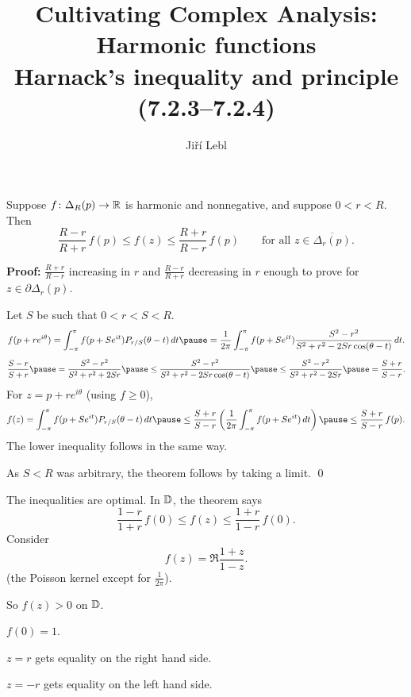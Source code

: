 \documentclass[10pt,aspectratio=169]{beamer}
\author{Ji\v{r}\'i Lebl}
\institute[OSU]{%
Departemento pri Matematiko de Oklahoma {\^S}tata Universitato}
\title{Cultivating Complex Analysis:\\%
Harmonic functions\\%
Harnack's inequality and principle (7.2.3--7.2.4)}
\date{}
\begin{document}
\begin{frame}
\titlepage
\end{frame}

\begin{frame}
\begin{theorem}
Suppose $f \colon \Delta_R(p) \to {\mathbb{R}}$ is harmonic and nonnegative,
and suppose $0 < r < R$.
Then
\vspace*{-6pt}
\[
\frac{R-r}{R+r} \, f(p) \leq f(z) \leq \frac{R+r}{R-r} \, f(p)
\qquad
\text{for all } z \in \overline{\Delta_r(p)}.
\]
\end{theorem}

\pause

\textbf{Proof:}
$\frac{R+r}{R-r}$ increasing in $r$ and
$\frac{R-r}{R+r}$ decreasing in $r$
\pause
\wthus
enough to prove for
$z \in \partial \Delta_r(p)$.

\pause
Let $S$ be such that $0 < r < S < R$.
\pause
\[
f(p + re^{i\theta})
=
\int_{-\pi}^\pi f(p+Se^{it}) P_{r/S}(\theta-t) \, dt
\pause
=
\frac{1}{2\pi} 
\int_{-\pi}^\pi f(p+Se^{it})
\frac{S^2-r^2}{S^2+r^2-2Sr \cos (\theta-t)}
\, dt .
\]
\pause
\[
\frac{S-r}{S+r}
\pause
=
\frac{S^2-r^2}{S^2+r^2+2Sr}
\pause
\leq
\frac{S^2-r^2}{S^2+r^2-2Sr \cos (\theta-t)}
\pause
\leq
\frac{S^2-r^2}{S^2+r^2-2Sr}
\pause
=
\frac{S+r}{S-r} .
\]
\pause
For $z = p+re^{i\theta}$ (using $f \geq 0$),
\[
f(z)
=
\int_{-\pi}^\pi f(p+Se^{it}) P_{r/S}(\theta-t) \, dt
\pause
\leq
\frac{S+r}{S-r} 
\left(
\frac{1}{2\pi}
\int_{-\pi}^\pi f(p+Se^{it}) \, dt
\right)
\pause
\leq
\frac{S+r}{S-r} 
\,
f(p) .
\]
\pause
The lower inequality follows in the same way.

\pause
As $S<R$ was arbitrary, the theorem follows by taking a limit.
\qed
\end{frame}

\begin{frame}
The inequalities are optimal.
\pause
In ${\mathbb{D}}$, the theorem says
\begin{equation*}
\frac{1-r}{1+r} \, f(0) \leq f(z) \leq \frac{1+r}{1-r} \, f(0) .
\end{equation*}
\pause
Consider
\[f(z) = \Re \frac{1+z}{1-z}.\]
(the Poisson kernel except for
$\frac{1}{2\pi}$).

\pause
\medskip

So $f(z) > 0$ on ${\mathbb{D}}$.

\pause
\medskip

$f(0)=1$.

\medskip
\pause

$z=r$ gets equality on the right hand side.

\medskip
\pause

$z=-r$ gets equality on the left hand side.
\end{frame}
\end{document}
